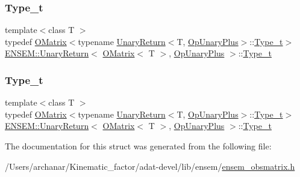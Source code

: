 \subsubsection{\texorpdfstring{Type\_t}{Type\_t}\hspace{0.1cm}{\footnotesize\ttfamily [2/3]}}
{\footnotesize\ttfamily template$<$class T $>$ \\
typedef \mbox{\hyperlink{classENSEM_1_1OMatrix}{O\+Matrix}}$<$typename \mbox{\hyperlink{structENSEM_1_1UnaryReturn}{Unary\+Return}}$<$T, \mbox{\hyperlink{structENSEM_1_1OpUnaryPlus}{Op\+Unary\+Plus}}$>$\+::\mbox{\hyperlink{structENSEM_1_1UnaryReturn_3_01OMatrix_3_01T_01_4_00_01OpUnaryPlus_01_4_a2ba28aeb9736737902accf36b7c69fa1}{Type\+\_\+t}}$>$ \mbox{\hyperlink{structENSEM_1_1UnaryReturn}{E\+N\+S\+E\+M\+::\+Unary\+Return}}$<$ \mbox{\hyperlink{classENSEM_1_1OMatrix}{O\+Matrix}}$<$ T $>$, \mbox{\hyperlink{structENSEM_1_1OpUnaryPlus}{Op\+Unary\+Plus}} $>$\+::\mbox{\hyperlink{structENSEM_1_1UnaryReturn_3_01OMatrix_3_01T_01_4_00_01OpUnaryPlus_01_4_a2ba28aeb9736737902accf36b7c69fa1}{Type\+\_\+t}}}

\mbox{\label{structENSEM_1_1UnaryReturn_3_01OMatrix_3_01T_01_4_00_01OpUnaryPlus_01_4_a2ba28aeb9736737902accf36b7c69fa1}} 
\subsubsection{\texorpdfstring{Type\_t}{Type\_t}\hspace{0.1cm}{\footnotesize\ttfamily [3/3]}}
{\footnotesize\ttfamily template$<$class T $>$ \\
typedef \mbox{\hyperlink{classENSEM_1_1OMatrix}{O\+Matrix}}$<$typename \mbox{\hyperlink{structENSEM_1_1UnaryReturn}{Unary\+Return}}$<$T, \mbox{\hyperlink{structENSEM_1_1OpUnaryPlus}{Op\+Unary\+Plus}}$>$\+::\mbox{\hyperlink{structENSEM_1_1UnaryReturn_3_01OMatrix_3_01T_01_4_00_01OpUnaryPlus_01_4_a2ba28aeb9736737902accf36b7c69fa1}{Type\+\_\+t}}$>$ \mbox{\hyperlink{structENSEM_1_1UnaryReturn}{E\+N\+S\+E\+M\+::\+Unary\+Return}}$<$ \mbox{\hyperlink{classENSEM_1_1OMatrix}{O\+Matrix}}$<$ T $>$, \mbox{\hyperlink{structENSEM_1_1OpUnaryPlus}{Op\+Unary\+Plus}} $>$\+::\mbox{\hyperlink{structENSEM_1_1UnaryReturn_3_01OMatrix_3_01T_01_4_00_01OpUnaryPlus_01_4_a2ba28aeb9736737902accf36b7c69fa1}{Type\+\_\+t}}}



The documentation for this struct was generated from the following file\+:\begin{DoxyCompactItemize}
\item 
/\+Users/archanar/\+Kinematic\+\_\+factor/adat-\/devel/lib/ensem/\mbox{\hyperlink{adat-devel_2lib_2ensem_2ensem__obsmatrix_8h}{ensem\+\_\+obsmatrix.\+h}}\end{DoxyCompactItemize}
